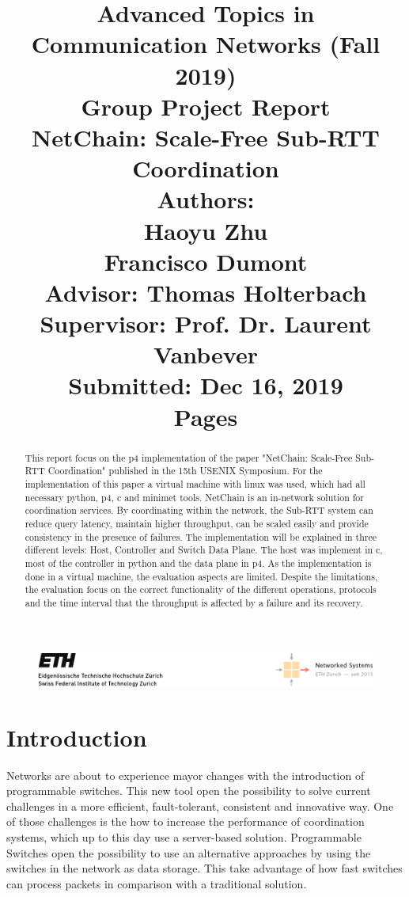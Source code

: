 \documentclass[11pt,oneside,a4paper]{article}
\title{
    \vspace*{0.0mm}
    \LARGE\bf\sf Advanced Topics in \\Communication Networks (Fall 2019)
    \vspace*{10.0mm} \\
    \Large\bf\sf Group Project Report \vspace*{30.0mm}\\
    \Huge\bf\sf NetChain: Scale-Free Sub-RTT Coordination
    \vspace*{30.0mm} \\
    \normalsize
    \sf Authors:\\[5pt]
    \sf Haoyu Zhu \\ [5pt]
    \sf Francisco Dumont \vspace*{5mm}\\
    \sf  Advisor: Thomas Holterbach \vspace*{5mm}\\
    \sf  Supervisor:  Prof. Dr. Laurent Vanbever \vspace*{20.0mm}\\
    \sf Submitted: Dec 16, 2019\\ [5pt]
    \sf \pageref{lastpage} Pages
}
\date{}
\begin{document}
\begin{figure}
    \includegraphics[width=\textwidth]{figures/eth-nsg-header}
\end{figure}

\maketitle
\thispagestyle{empty}
\raggedbottom
\clearpage


\begin{abstract}
    This report focus on the p4 implementation of the paper "NetChain: Scale-Free Sub-RTT Coordination"\cite{211261} published in the 15th USENIX Symposium. For the implementation of this paper a virtual machine with linux was used, which had all necessary python, p4, c and minimet tools. NetChain is an in-network solution for coordination services. By coordinating within the network, the Sub-RTT system can reduce query latency, maintain higher throughput, can be scaled easily and provide consistency in the presence of failures.
    The implementation  will be explained in three different levels: Host, Controller and Switch Data Plane. The host was implement in c, most of the controller in python and the data plane in p4. 
    As the implementation is done in a virtual machine, the evaluation aspects are limited. Despite the limitations, the evaluation focus on the correct functionality of the different operations, protocols and the time interval that the throughput is affected by a failure and its recovery.

\end{abstract}

\clearpage
\setcounter{tocdepth}{3}
\tableofcontents
\clearpage
{}

\section{Introduction}

Networks are about to experience mayor changes with the introduction of programmable switches. This new tool open the possibility to solve current challenges in a more efficient, fault-tolerant, consistent and innovative way. One of those challenges is the how to increase the performance of coordination systems, which up to this day use a server-based solution. Programmable Switches open the possibility to use an alternative approaches by using the switches in the network as data storage. This take advantage of how fast switches can process packets in comparison with a traditional solution.
\end{document}
